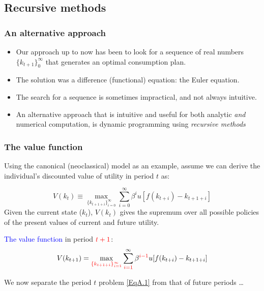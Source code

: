\documentclass[10pt, handout]{beamer}
\begin{document}
\subsection{Recursive methods}

\begin{frame}
\frametitle{An alternative approach}
\begin{itemize}
\item Our approach up to now has been to look for a sequence of real numbers $\{ k_{t+1} \}^{\infty}_{0}$ that generates an optimal consumption plan.
\item The solution was a difference (functional) equation: the Euler equation.
\item The search for a sequence is sometimes impractical, and not always intuitive.
\item An alternative approach that is intuitive and useful for both analytic \textit{and} numerical computation, is dynamic programming using \textit{recursive methods}
\end{itemize}


\end{frame}





\begin{frame}
\frametitle{The value function}

Using the canonical (neoclassical) model as an example, assume we can derive the individual's discounted value of utility in period $t$ as:

{ {
\begin{equation}\label{EqA.1}
V(k_t) \equiv \max_{\{k_{t+1+i}\}_{i=0}^{\infty}} \sum_{i=0}^{\infty} \beta^{i} u[f(k_{t+i})- k_{t+1+i}] %
\end{equation}
Given the current state ($k_t$), $V(k_t)$ gives the supremum over all possible policies of the present values of current and future utility. 
\vskip0.1in

\textcolor{blue}{The value function} in period ${\color{red}t+1}$:
\begin{equation}\label{EqA.2}
V(k_{t+1}) = \max_{\color{red}\{k_{t+1+i}\}_{i=1}^{\infty}} \sum_{{\color{red}i=1}}^{\infty} \beta^{{\color{red}i-1}} u
[f(k_{t+i})- k_{t+1+i} ]
\end{equation}

We now separate the period $t$ problem \eqref{EqA.1} from that of future periods \ldots

}}
\end{frame}
\end{document}
